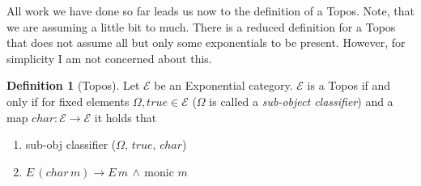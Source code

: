 \documentclass[a4paper, 11pt]{article}
\theoremstyle{definition}
\newtheorem{definition}[theorem]{Definition}
\newcommand{\notion}[1]{\text{#1 }}
\begin{document}
All work we have done so far leads us now to the definition of a Topos. Note, that we are assuming a little bit to much. There is a reduced definition for a Topos that does not assume all but only some exponentials to be present. However, for simplicity I am not concerned about this.

\begin{definition}[Topos]
	Let $\mathcal{E}$ be an Exponential category. $\mathcal{E}$ is a Topos if and only if for fixed elements $\Omega, true \in \mathcal{E}$ ($\Omega$ is called a \emph{sub-object classifier}) and a map $char: \mathcal{E} \to \mathcal{E}$ it holds that
	\begin{enumerate}
		\item sub-obj classifier ($\Omega, \, true, \, char$)
		\item $E \, (char \, m) \longrightarrow E \, m \, \wedge \, \notion{monic} m$
	\end{enumerate}
\end{definition}
\end{document}
